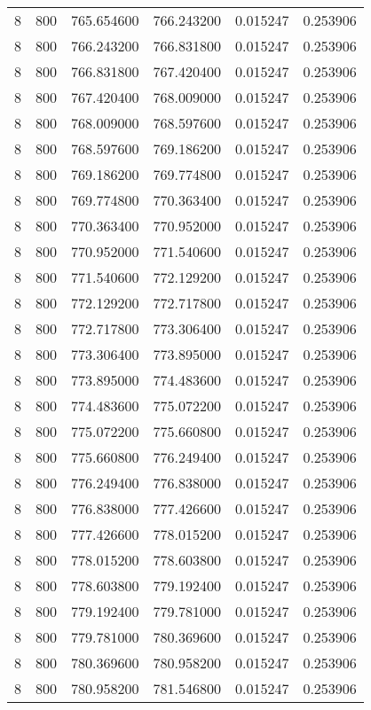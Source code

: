 \begin{longtable}{rrrrrr}
8 & 800 & 765.654600 & 766.243200 & 0.015247 & 0.253906 \\
8 & 800 & 766.243200 & 766.831800 & 0.015247 & 0.253906 \\
8 & 800 & 766.831800 & 767.420400 & 0.015247 & 0.253906 \\
8 & 800 & 767.420400 & 768.009000 & 0.015247 & 0.253906 \\
8 & 800 & 768.009000 & 768.597600 & 0.015247 & 0.253906 \\
8 & 800 & 768.597600 & 769.186200 & 0.015247 & 0.253906 \\
8 & 800 & 769.186200 & 769.774800 & 0.015247 & 0.253906 \\
8 & 800 & 769.774800 & 770.363400 & 0.015247 & 0.253906 \\
8 & 800 & 770.363400 & 770.952000 & 0.015247 & 0.253906 \\
8 & 800 & 770.952000 & 771.540600 & 0.015247 & 0.253906 \\
8 & 800 & 771.540600 & 772.129200 & 0.015247 & 0.253906 \\
8 & 800 & 772.129200 & 772.717800 & 0.015247 & 0.253906 \\
8 & 800 & 772.717800 & 773.306400 & 0.015247 & 0.253906 \\
8 & 800 & 773.306400 & 773.895000 & 0.015247 & 0.253906 \\
8 & 800 & 773.895000 & 774.483600 & 0.015247 & 0.253906 \\
8 & 800 & 774.483600 & 775.072200 & 0.015247 & 0.253906 \\
8 & 800 & 775.072200 & 775.660800 & 0.015247 & 0.253906 \\
8 & 800 & 775.660800 & 776.249400 & 0.015247 & 0.253906 \\
8 & 800 & 776.249400 & 776.838000 & 0.015247 & 0.253906 \\
8 & 800 & 776.838000 & 777.426600 & 0.015247 & 0.253906 \\
8 & 800 & 777.426600 & 778.015200 & 0.015247 & 0.253906 \\
8 & 800 & 778.015200 & 778.603800 & 0.015247 & 0.253906 \\
8 & 800 & 778.603800 & 779.192400 & 0.015247 & 0.253906 \\
8 & 800 & 779.192400 & 779.781000 & 0.015247 & 0.253906 \\
8 & 800 & 779.781000 & 780.369600 & 0.015247 & 0.253906 \\
8 & 800 & 780.369600 & 780.958200 & 0.015247 & 0.253906 \\
8 & 800 & 780.958200 & 781.546800 & 0.015247 & 0.253906 \\

\end{longtable}
